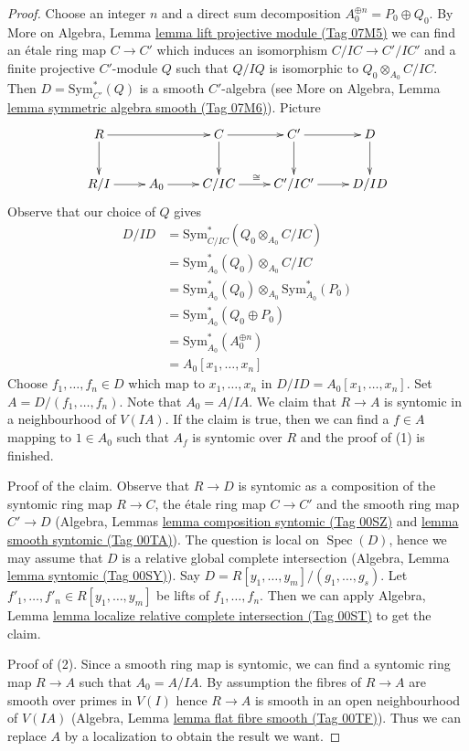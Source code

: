 \documentclass{amsart}
\theoremstyle{plain}
\theoremstyle{definition}
\theoremstyle{remark}
\numberwithin{equation}{subsection}
\def\Spec{\mathop{\mathrm{Spec}}}
\begin{document}
\begin{proof}
\medskip\noindent
Choose an integer $n$ and a direct sum decomposition
$A_0^{\oplus n} = P_0 \oplus Q_0$.
By More on Algebra, Lemma \href{https://stacks.math.columbia.edu/tag/07M5}{lemma lift projective module (Tag 07M5)}
we can find an \'etale ring map $C \to C'$ which induces
an isomorphism $C/IC \to C'/IC'$ and a finite projective
$C'$-module $Q$ such that $Q/IQ$ is isomorphic to
$Q_0 \otimes_{A_0} C/IC$.
Then $D = \text{Sym}_{C'}^*(Q)$ is a smooth $C'$-algebra (see
More on Algebra, Lemma \href{https://stacks.math.columbia.edu/tag/07M6}{lemma symmetric algebra smooth (Tag 07M6)}).
Picture
$$
\xymatrix{
R \ar[d] \ar[rr] & &
C \ar[r] \ar[d] &
C' \ar[r] \ar[d] &
D \ar[d] \\
R/I \ar[r] &
A_0 \ar[r] &
C/IC \ar[r]^{\cong} &
C'/IC' \ar[r] &
D/ID
}
$$
Observe that our choice of $Q$ gives
\begin{align*}
D/ID & =
\text{Sym}_{C/IC}^*(Q_0 \otimes_{A_0} C/IC) \\
& =
\text{Sym}_{A_0}^*(Q_0) \otimes_{A_0} C/IC \\
& =
\text{Sym}_{A_0}^*(Q_0) \otimes_{A_0}
\text{Sym}_{A_0}^*(P_0) \\
& =
\text{Sym}_{A_0}^*(Q_0 \oplus P_0) \\
& =
\text{Sym}_{A_0}^*(A_0^{\oplus n}) \\
& =
A_0[x_1, \ldots, x_n]
\end{align*}
Choose $f_1, \ldots, f_n \in D$ which map to $x_1, \ldots, x_n$
in $D/ID = A_0[x_1, \ldots, x_n]$. Set $A = D/(f_1, \ldots, f_n)$.
Note that $A_0 = A/IA$. We claim that $R \to A$ is syntomic
in a neighbourhood of $V(IA)$. If the claim is true, then we can
find a $f \in A$ mapping to $1 \in A_0$ such that $A_f$ is syntomic
over $R$ and the proof of (1) is finished.

\medskip\noindent
Proof of the claim. Observe that $R \to D$ is syntomic as a composition
of the syntomic ring map $R \to C$, the \'etale ring map $C \to C'$ and the
smooth ring map $C' \to D$ (Algebra, Lemmas
\href{https://stacks.math.columbia.edu/tag/00SZ}{lemma composition syntomic (Tag 00SZ)} and
\href{https://stacks.math.columbia.edu/tag/00TA}{lemma smooth syntomic (Tag 00TA)}).
The question is local on $\Spec(D)$, hence we
may assume that $D$ is a relative global complete intersection
(Algebra, Lemma \href{https://stacks.math.columbia.edu/tag/00SY}{lemma syntomic (Tag 00SY)}).
Say $D = R[y_1, \ldots, y_m]/(g_1, \ldots, g_s)$.
Let $f'_1, \ldots, f'_n \in R[y_1, \ldots, y_m]$ be lifts of
$f_1, \ldots, f_n$. Then we can apply
Algebra, Lemma \href{https://stacks.math.columbia.edu/tag/00ST}{lemma localize relative complete intersection (Tag 00ST)}
to get the claim.

\medskip\noindent
Proof of (2). Since a smooth ring map is syntomic, we can find
a syntomic ring map $R \to A$ such that $A_0 = A/IA$.
By assumption the fibres of $R \to A$ are smooth over primes in $V(I)$
hence $R \to A$ is smooth in an open neighbourhood of $V(IA)$
(Algebra, Lemma \href{https://stacks.math.columbia.edu/tag/00TF}{lemma flat fibre smooth (Tag 00TF)}).
Thus we can replace $A$ by a localization to obtain the result we want.
\end{proof}
\end{document}
